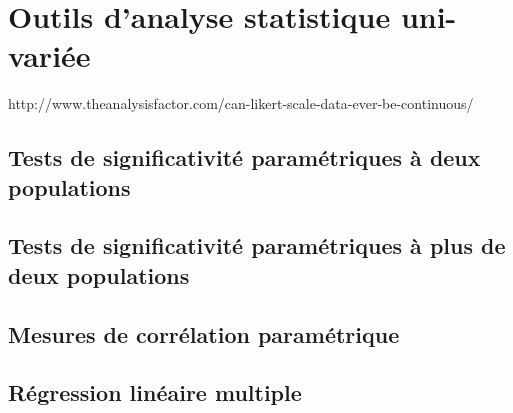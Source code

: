 \chapter{Outils d'analyse statistique uni-variée}
\label{app:statuni}

http://www.theanalysisfactor.com/can-likert-scale-data-ever-be-continuous/

\section{Tests de significativité paramétriques à deux populations}

\section{Tests de significativité paramétriques à plus de deux populations}

\section{Mesures de corrélation paramétrique}
\label{app:corr}

\section{Régression linéaire multiple}

